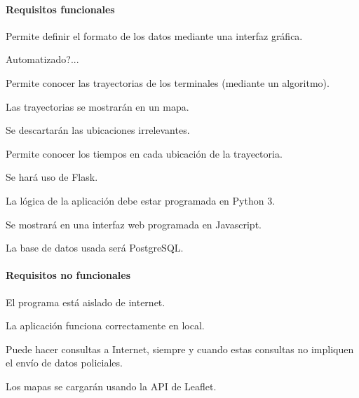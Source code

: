 \paragraph{Requisitos funcionales}

\begin{functional}
        \item Permite definir el formato de los datos mediante una interfaz gráfica.
        \begin{functional}
                \item Automatizado?...\cite{Narendra1990}\cite{WinNT}
        \end{functional}
    
        \item Permite  conocer las trayectorias de los terminales (mediante un algoritmo).
        \begin{functional}
        	\item Las trayectorias se mostrarán en un mapa.
        	\item Se descartarán las ubicaciones irrelevantes.
        \end{functional}
    	\item Permite conocer los tiempos en cada ubicación de la trayectoria.
        

		\item Se hará uso de Flask.
		\begin{functional}
			\item La lógica de la aplicación debe estar programada en Python 3.
			\item Se mostrará en una interfaz web programada en Javascript.
		\end{functional}

		\item La base de datos usada será PostgreSQL.        
\end{functional}

\paragraph{Requisitos no funcionales}

\begin{nonfunctional}
        \item El programa está aislado de internet.
        \begin{nonfunctional}
                \item La aplicación funciona correctamente en local.
                \item Puede hacer consultas a Internet, siempre y cuando estas consultas no impliquen el envío de datos policiales.
        \end{nonfunctional}
    

        \item Los mapas se cargarán usando la API de Leaflet.
\end{nonfunctional}